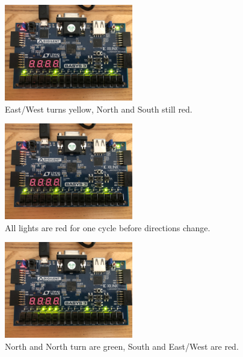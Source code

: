 \documentclass[11pt]{article}
\begin{document}
\begin{figure}[H]
\begin{center}
	\includegraphics[width=0.5\textwidth]{./images/Part1/l9p1img5.jpg}
	\caption{\label{fig:part1_img5}East/West turns yellow, North and South still red.}
\end{center}
\end{figure}

\begin{figure}[H]
\begin{center}
	\includegraphics[width=0.5\textwidth]{./images/Part1/l9p1img6.jpg}
	\caption{\label{fig:part1_img6}All lights are red for one cycle before directions change.}
\end{center}
\end{figure}

\begin{figure}[H]
\begin{center}
	\includegraphics[width=0.5\textwidth]{./images/Part1/l9p1img7.jpg}
	\caption{\label{fig:part1_img7}North and North turn are green, South and East/West are red.}
\end{center}
\end{figure}
\end{document}
